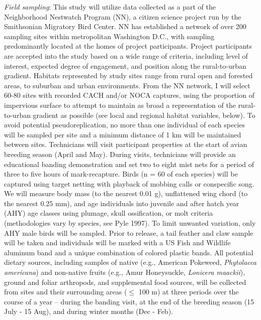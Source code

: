 \documentclass[12pt]{article}
\begin{document}
\noindent \textit {Field sampling}: This study will utilize data collected as a part of the Neighborhood Nestwatch Program (NN), a citizen science project run by the Smithsonian Migratory Bird Center. NN has established a network of over 200 sampling sites within metropolitan Washington D.C., with sampling predominantly located at the homes of project participants. Project participants are accepted into the study based on a wide range of criteria, including level of interest, expected degree of engagement, and position along the rural-to-urban gradient. Habitats represented by study sites range from rural open and forested areas, to suburban and urban environments. From the NN network, I will select 60-80 sites with recorded CACH and/or NOCA captures, using the proportion of impervious surface to attempt to maintain as broad a representation of the rural-to-urban gradient as possible (see local and regional habitat variables, below). To avoid potential pseudoreplication, no more than one individual of each species will be sampled per site and a minimum distance of 1 km will be maintained between sites. Technicians will visit participant properties at the start of avian breeding season (April and May). During visits, technicians will provide an educational banding demonstration and set two to eight mist nets for a period of three to five hours of mark-recapture. Birds (n = 60 of each species) will be captured using target netting with playback of mobbing calls or conspecific song. We will measure body mass (to the nearest 0.01 g), unflattened wing chord (to the nearest 0.25 mm), and age individuals into juvenile and after hatch year (AHY) age classes using plumage, skull ossification, or molt criteria (methodologies vary by species, see Pyle 1997). To limit unwanted variation, only AHY male birds will be sampled. Prior to release, a  tail feather and claw sample will be taken and individuals will be marked with a US Fish and Wildlife aluminum band and a unique combination of colored plastic bands. All potential dietary sources, including samples of native  (e.g., American  Pokeweed, \textit {Phytolacca americana}) and non-native fruits (e.g., Amur Honeysuckle, \textit {Lonicera maackii}), ground and foliar arthropods, and supplemental food sources, will be collected from sites and their surrounding areas ($\leq$ 100 m) at three periods over the course of a year -- during the banding visit, at the end of the breeding season (15 July - 15 Aug), and during winter months (Dec - Feb).\par
\end{document}
